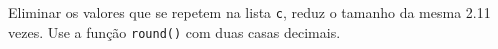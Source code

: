 \documentclass[12pt,varwidth=16cm,border=1pt]{standalone}
\begin{document}
Eliminar os valores que se repetem na lista \verb+c+, reduz o tamanho da mesma 2.11 vezes. Use a função \verb+round()+ com duas casas decimais.

\questiomfalse
\end{document}
